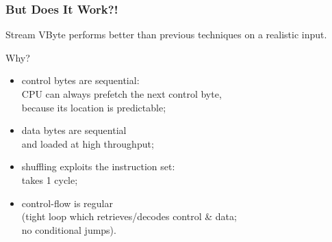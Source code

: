 \begin{frame}
\frametitle{But Does It Work?!}

\vspace*{-1em}
\large\begin{changemargin}{1cm}
Stream VByte performs better than previous techniques on a realistic input.


Why?

\begin{itemize}
\item control bytes are sequential:\\
\hspace*{1em} CPU can always prefetch the next control byte, \\
\hspace*{1em} because
its location is predictable;
\item data bytes are sequential \\
\hspace*{1em}and loaded at high throughput;
\item shuffling exploits the instruction set: \\
\hspace*{1em}takes 1 cycle;
\item control-flow is regular \\
\hspace*{1em}(tight loop which retrieves/decodes control
\& data;\\
\hspace*{1em}no conditional jumps).
\end{itemize}
\end{changemargin}
\end{frame}





